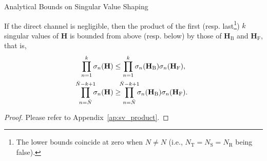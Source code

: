 \begin{section}{Analytical Bounds on Singular Value Shaping}
	\begin{corollary}
		If the direct channel is negligible,
		then the product of the first (resp. last\footnote{The lower bounds coincide at zero when $N \ne N$ (i.e., $N_\mathrm{T} = N_\mathrm{S} = N_\mathrm{R}$ being false).}) $k$ singular values of $\mathbf{H}$ is bounded from above (resp. below) by those of $\mathbf{H}_\mathrm{B}$ and $\mathbf{H}_\mathrm{F}$, that is,
		\begin{subequations}
			\begin{align}
				\prod_{n=1}^k \sigma_n(\mathbf{H})                   & \le \prod_{n=1}^k \sigma_n(\mathbf{H}_\mathrm{B}) \sigma_n(\mathbf{H}_\mathrm{F}), \label{iq:sv_product_largest}                    \\
				\prod_{n=\bar{N}}^{\mathclap{\bar{N}-k+1}} \sigma_n(\mathbf{H}) & \ge \prod_{n=\bar{N}}^{\mathclap{\bar{N}-k+1}} \sigma_n(\mathbf{H}_\mathrm{B}) \sigma_n(\mathbf{H}_\mathrm{F}). \label{iq:sv_product_smallest}
			\end{align}
		\end{subequations}
	\end{corollary}

	\begin{proof}
		Please refer to Appendix~\ref{ap:sv_product}.
	\end{proof}



\end{section}

